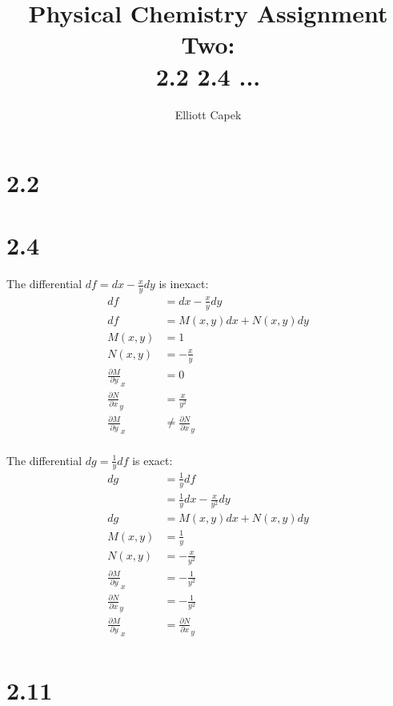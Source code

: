 \documentclass[10pt]{article} %
\title{Physical Chemistry Assignment Two:\\2.2 2.4 ...}
\author{Elliott Capek}
\begin{document}
\maketitle{}

\section{2.2}

\section{2.4}

The differential $df = dx - \frac{x}{y}dy$ is inexact:
\begin{align}
  df &= dx - \frac{x}{y}dy\\
  df &= M(x,y)dx + N(x,y)dy\\
  M(x,y) &= 1\\
  N(x,y) &= -\frac{x}{y}\\
  \frac{\partial M}{\partial y}_x &= 0\\
  \frac{\partial N}{\partial x}_y &= \frac{x}{y^2}\\
  \frac{\partial M}{\partial y}_x &\neq \frac{\partial N}{\partial x}_y\\
\end{align}

The differential $dg = \frac{1}{y}df$ is exact:
\begin{align}
  dg &= \frac{1}{y}df\\
     &= \frac{1}{y}dx - \frac{x}{y^2}dy\\
  dg &= M(x,y)dx + N(x,y)dy\\
  M(x,y) &= \frac{1}{y}\\
  N(x,y) &= -\frac{x}{y^2}\\
  \frac{\partial M}{\partial y}_x &= -\frac{1}{y^2}\\
  \frac{\partial N}{\partial x}_y &= -\frac{1}{y^2}\\
  \frac{\partial M}{\partial y}_x &= \frac{\partial N}{\partial x}_y\\
\end{align}


\section{2.11}
\end{document}
